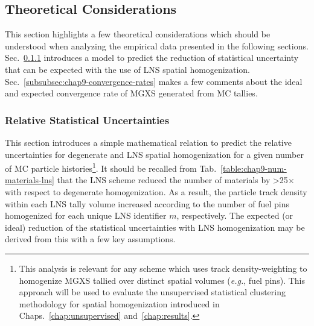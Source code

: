 \subsection{Theoretical Considerations}
\label{subsec:chap9-theory}

This section highlights a few theoretical considerations which should be understood when analyzing the empirical data presented in the following sections. Sec.~\ref{subsubsec:chap9-relative-uncertainties} introduces a model to predict the reduction of statistical uncertainty that can be expected with the use of \ac{LNS} spatial homogenization. Sec.~\ref{subsubsec:chap9-convergence-rates} makes a few comments about the ideal and expected convergence rate of \ac{MGXS} generated from \ac{MC} tallies.

\subsubsection{Relative Statistical Uncertainties}
\label{subsubsec:chap9-relative-uncertainties}

This section introduces a simple mathematical relation to predict the relative uncertainties for degenerate and \ac{LNS} spatial homogenization for a given number of \ac{MC} particle histories\footnote{This analysis is relevant for any scheme which uses track density-weighting to homogenize \ac{MGXS} tallied over distinct spatial volumes (\textit{e.g.}, fuel pins). This approach will be used to evaluate the unsupervised statistical clustering methodology for spatial homogenization introduced in Chaps.~\ref{chap:unsupervised} and~\ref{chap:results}.}. It should be recalled from Tab.~\ref{table:chap9-num-materials-lns} that the \ac{LNS} scheme reduced the number of materials by >25$\times$ with respect to degenerate homogenization. As a result, the particle track density within each \ac{LNS} tally volume increased according to the number of fuel pins homogenized for each unique \ac{LNS} identifier $m$, respectively. The expected (or ideal) reduction of the statistical uncertainties with \ac{LNS} homogenization may be derived from this with a few key assumptions. 

